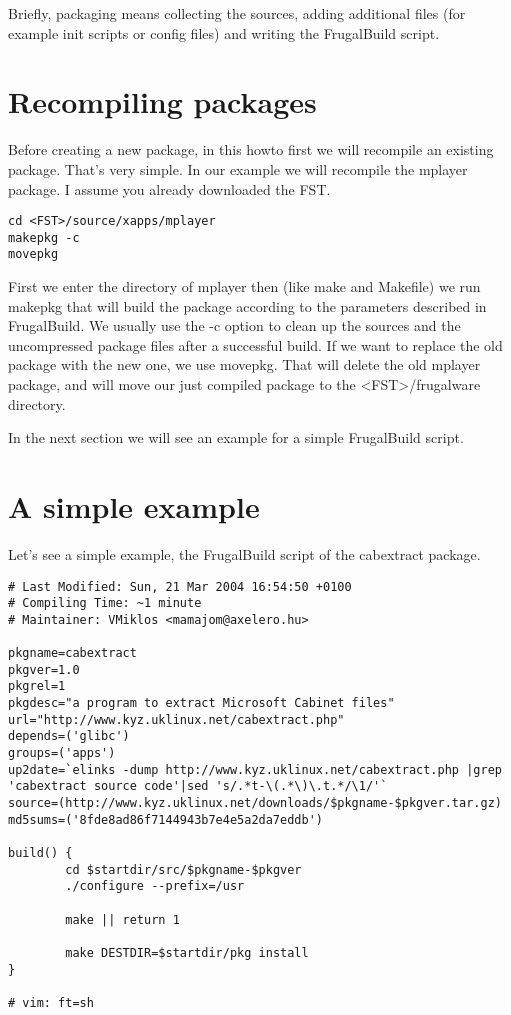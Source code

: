 Briefly, packaging means collecting the sources, adding additional files (for example init scripts or config files) and writing the FrugalBuild script.

\section{Recompiling packages}

Before creating a new package, in this howto first we will recompile an existing package. That's very simple. In our example we will recompile the mplayer package. I assume you already downloaded the FST.

\begin {verbatim}
cd <FST>/source/xapps/mplayer
makepkg -c
movepkg
\end{verbatim}

First we enter the directory of mplayer then (like make and Makefile) we run makepkg that will build the package according to the parameters described in FrugalBuild. We usually use the -c option to clean up the sources and the uncompressed package files after a successful build. If we want to replace the old package with the new one, we use movepkg. That will delete the old mplayer package, and will move our just compiled package to the <FST>/frugalware directory.

In the next section we will see an example for a simple FrugalBuild script.

\section{A simple example}
Let's see a simple example, the FrugalBuild script of the cabextract package.
\begin{verbatim}
# Last Modified: Sun, 21 Mar 2004 16:54:50 +0100
# Compiling Time: ~1 minute
# Maintainer: VMiklos <mamajom@axelero.hu>

pkgname=cabextract
pkgver=1.0
pkgrel=1
pkgdesc="a program to extract Microsoft Cabinet files"
url="http://www.kyz.uklinux.net/cabextract.php"
depends=('glibc')
groups=('apps')
up2date=`elinks -dump http://www.kyz.uklinux.net/cabextract.php |grep 'cabextract source code'|sed 's/.*t-\(.*\)\.t.*/\1/'`
source=(http://www.kyz.uklinux.net/downloads/$pkgname-$pkgver.tar.gz)
md5sums=('8fde8ad86f7144943b7e4e5a2da7eddb')

build() {
        cd $startdir/src/$pkgname-$pkgver
        ./configure --prefix=/usr
	
        make || return 1
	
        make DESTDIR=$startdir/pkg install
}

# vim: ft=sh
\end{verbatim}

